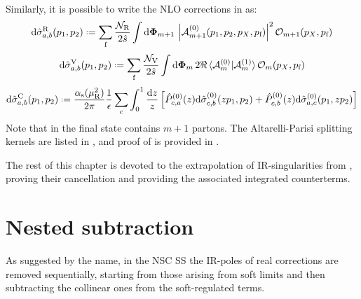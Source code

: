 Similarly, it is possible to write the NLO corrections in  as:
\begin{equation}
  \dd\pcs_{a,b}^\text{R}(p_1 , p_2) \defeq \sum_\text{f} \frac{\mathcal{N}_\text{R}}{2\hat{s}} \int \lps_{m+1} \, \abs{\ampl^{(0)}_{m+1}(p_1, p_2, p_X, p_\text{f})}^2 \op_{m+1}(p_X, p_\text{f})
  \label{eq:real-cs}
\end{equation}
\begin{equation}
  \dd\pcs_{a,b}^\text{V}(p_1 , p_2) \defeq \sum_\text{f} \frac{\mathcal{N}_\text{V}}{2\hat{s}} \int \lps_m \, 2\Re \braket{\ampl_m^{(0)} | \ampl_m^{(1)}} \op_m(p_X, p_\text{f})
  \label{eq:virt-cs}
\end{equation}
\begin{equation}
  \dd\pcs_{a,b}^\text{C}(p_1 , p_2) \defeq \frac{\rcr}{2\pi} \frac{1}{\de} \sum_c \int_0^1 \frac{\dd z}{z} \left[ \hat{P}_{c,a}^{(0)}(z) \dd\pcs_{c,b}^{(0)}(z p_1 , p_2) + \hat{P}_{c,b}^{(0)}(z) \dd\pcs_{a,c}^{(0)}(p_1 , z p_2) \right]
  \label{eq:pdf-cs}
\end{equation}
Note that in  the final state contains $ m + 1 $ partons. The Altarelli-Parisi splitting kernels are listed in , and proof of  is provided in .

The rest of this chapter is devoted to the extrapolation of IR-singularities from , proving their cancellation and providing the associated integrated counterterms.

\section{Nested subtraction}

As suggested by the name, in the NSC SS the IR-poles of real corrections are removed sequentially, starting from those arising from soft limits and then subtracting the collinear ones from the soft-regulated terms.

